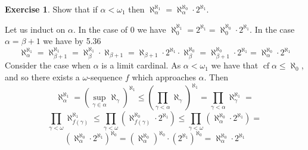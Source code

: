 \documentclass{article}
\theoremstyle{definition}
\newtheorem{exer}{Exercise}[section]
\DeclareMathOperator{\cf}{cf}
\newlength{\defparindent}
\newenvironment{answer}
    {\begin{mdframed}[backgroundcolor=gray!15, linewidth=0pt] \setlength{\parindent}{\defparindent}}
    {\end{mdframed}}
\begin{document}
\begin{exer}
    Show that if $\alpha < \omega_1$ then $\aleph_{\alpha}^{\aleph_1} = \aleph_{\alpha}^{\aleph_0} \cdot 2^{\aleph_1}$.
    \begin{answer}
        Let us induct on $\alpha$. In the case of $0$ we have $\aleph_{0}^{\aleph_1} = 2^{\aleph_1} = \aleph_{0}^{\aleph_0} \cdot 2^{\aleph_1}$. In the case $\alpha = \beta + 1$ we have by 5.36 
        \[
            \aleph_{\alpha}^{\aleph_1} 
            =
            \aleph_{\beta + 1}^{\aleph_1} 
            =
            \aleph_{\beta}^{\aleph_1} \cdot \aleph_{\beta + 1}
            =
            \aleph_{\beta + 1} \cdot 2^{\aleph_1} \cdot \aleph_{\beta}^{\aleph_0}
            =
            \aleph_{\beta + 1}^{\aleph_0} \cdot 2^{\aleph_1} 
            =
            \aleph_{\alpha}^{\aleph_0} \cdot 2^{\aleph_1}
        \]
        Consider the case when $\alpha$ is a limit cardinal. As $\alpha < \omega_1$ we have that $\cf \alpha \le \aleph_0$, and so there exists a $\omega$-sequence $f$ which approaches $\alpha$. Then
        \[
            \aleph_{\alpha}^{\aleph_1} = 
            (\sup_{\gamma \in \alpha} \aleph_\gamma)^{\aleph_1}
            \le
            (\prod_{\gamma < \alpha} \aleph_\gamma)^{\aleph_1}
            = 
            \prod_{\gamma < \alpha} \aleph_{\gamma}^{\aleph_1}
            = 
        \]
        \[
            \prod_{\gamma < \omega} \aleph_{f(\gamma)}^{\aleph_1}
            \le 
            \prod_{\gamma < \omega} (\aleph_{f(\gamma)}^{\aleph_0} \cdot 2^{\aleph_1})
            \le
            \prod_{\gamma < \omega} (\aleph_{\alpha}^{\aleph_0} \cdot 2^{\aleph_1})
            =
        \]
        \[ 
            (\aleph_{\alpha}^{\aleph_0} \cdot 2^{\aleph_1})^{\aleph_0}
            =
            (\aleph_{\alpha}^{\aleph_0})^{\aleph_0} \cdot (2^{\aleph_1})^{\aleph_0}
            =
            \aleph_{\alpha}^{\aleph_0} \cdot 2^{\aleph_1}
        \]
    \end{answer}
\end{exer}
\end{document}
